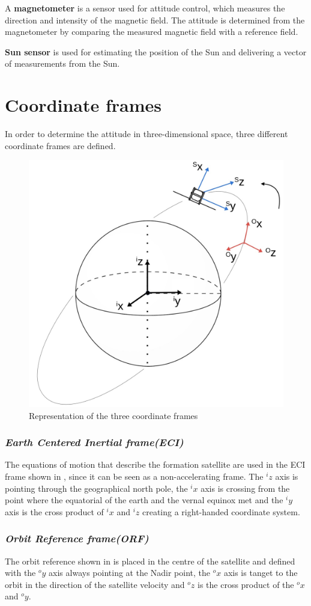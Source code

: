 A \textbf{magnetometer} is a sensor used for attitude control, which measures the direction and intensity of the magnetic field. The attitude is determined from the magnetometer by comparing the measured magnetic field with a reference field.

\textbf{Sun sensor} is used for estimating the position of the Sun and delivering a vector of measurements from the Sun.
\section{Coordinate frames}
In order to determine the attitude in three-dimensional space, three different coordinate frames are defined.
\begin{figure}[H]
	\centering
	\includegraphics[width=0.7\linewidth]{figures/ref_frames}
	\caption{Representation of the three coordinate frames }
	\label{fig:ref_frames}
\end{figure}
\subsubsection{\textit{Earth Centered Inertial frame(ECI)}}
The equations of motion that describe the formation satellite are used in the ECI frame shown in , since it can be seen as a non-accelerating frame. The $^iz$ axis is pointing through the geographical north pole, the $^ix$ axis is crossing from the point where the equatorial of the earth and the vernal equinox met and the $^iy$ axis is the cross product of $^ix$ and $^iz$ creating a right-handed coordinate system. 
\subsubsection{\textit{Orbit Reference frame(ORF)}}
The orbit reference shown in  is placed in the centre of the satellite and defined with the $^oy$ axis always pointing at the Nadir point, the $^ox$ axis is tanget to the orbit in the direction of the satellite velocity and $^oz$ is the cross product of the $^ox$  and $^oy$. 
